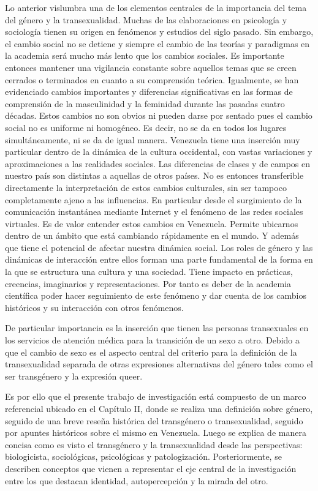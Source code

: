 Lo anterior vislumbra una de los elementos centrales de la importancia del tema
del género y la transexualidad. Muchas de las elaboraciones en psicología y
sociología tienen su origen en fenómenos y estudios del siglo pasado. Sin
embargo, el cambio social no se detiene y siempre el cambio de las teorías y
paradigmas en la academia será mucho más lento que los cambios sociales. Es
importante entonces mantener una vigilancia constante sobre aquellos temas que
se creen cerrados o terminados en cuanto a su comprensión teórica. Igualmente,
se han evidenciado cambios importantes y diferencias significativas en las
formas de comprensión de la masculinidad y la feminidad durante las pasadas
cuatro décadas. Estos cambios no son obvios ni pueden darse por sentado pues el
cambio social no es uniforme ni homogéneo. Es decir, no se da en todos los
lugares simultáneamente, ni se da de igual manera. Venezuela tiene una inserción
muy particular dentro de la dinámica de la cultura occidental, con vastas
variaciones y aproximaciones a las realidades sociales. Las diferencias de
clases y de campos en nuestro país son distintas a aquellas de otros países. No
es entonces transferible directamente la interpretación de estos cambios
culturales, sin ser tampoco completamente ajeno a las influencias. En particular
desde el surgimiento de la comunicación instantánea mediante Internet y el
fenómeno de las redes sociales virtuales. Es de valor entender estos cambios en
Venezuela. Permite ubicarnos dentro de un ámbito que está cambiando rápidamente
en el mundo. Y además que tiene el potencial de afectar nuestra dinámica
social. Los roles de género y las dinámicas de interacción entre ellos forman una
parte fundamental de la forma en la que se estructura una cultura y una
sociedad. Tiene impacto en prácticas, creencias, imaginarios y representaciones.
Por tanto es deber de la academia científica poder hacer seguimiento de este
fenómeno y dar cuenta de los cambios históricos y su interacción con otros
fenómenos.

De particular importancia es la inserción que tienen las personas transexuales
en los servicios de atención médica para la transición de un sexo a otro. Debido
a que el cambio de sexo es el aspecto central del criterio para la definición de
la transexualidad separada de otras expresiones alternativas del género tales
como el ser transgénero y la expresión queer.

Es por ello que el presente trabajo de investigación está compuesto de un
marco referencial ubicado en el Capítulo II, donde se realiza una definición
sobre género, seguido de una breve reseña histórica del transgénero o
transexualidad, seguido por apuntes históricos sobre el mismo en Venezuela.
Luego se explica de manera concisa como es visto el transgénero y la
transexualidad desde las perspectivas: biologicista, sociológicas, psicológicas
y patologización. Posteriormente, se describen conceptos que vienen a
representar el eje central de la investigación entre los que destacan identidad,
autopercepción y la mirada del otro.

